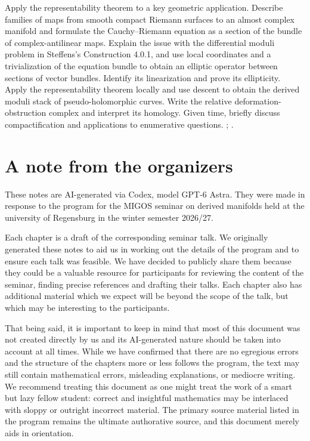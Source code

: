 \documentclass[11pt,a4paper]{book}
\begin{document}
{Apply the representability theorem to a key geometric application.}
{Describe families of maps from smooth compact Riemann surfaces to an almost complex manifold and formulate the Cauchy--Riemann equation as a section of the bundle of complex-antilinear maps. Explain the issue with the differential moduli problem in Steffens's Construction 4.0.1, and use local coordinates and a trivialization of the equation bundle to obtain an elliptic operator between sections of vector bundles. Identify its linearization and prove its ellipticity. Apply the representability theorem locally and use descent to obtain the derived moduli stack of pseudo-holomorphic curves. Write the relative deformation-obstruction complex and interpret its homology. Given time, briefly discuss compactification and applications to enumerative questions.}
{\textcite[Sections~2.1, 2.3--2.4, and
	3.3--3.4]{Wendl_Lectures_Holomorphic_Curves};
	\textcite[Section~4]{Steffens_Representability_Elliptic_Moduli}.}
	
\chapter*{A note from the organizers}

These notes are AI-generated via Codex, model GPT-6 Astra. They were made in response to the program for the MIGOS seminar on derived manifolds held at the university of Regensburg in the winter semester 2026/27. 

Each chapter is a draft of the corresponding seminar talk. We originally generated these notes to aid us in working out the details of the program and to ensure each talk was feasible. We have decided to publicly share them because they could be a valuable resource for participants for reviewing the content of the seminar, finding precise references and drafting their talks. Each chapter also has additional material which we expect will be beyond the scope of the talk, but which may be interesting to the participants.

That being said, it is important to keep in mind that most of this document was not created directly by us and its AI-generated nature should be taken into account at all times. While we have confirmed that there are no egregious errors and the structure of the chapters more or less follows the program, the text may still contain mathematical errors, misleading explanations, or mediocre writing. We recommend treating this document as one might treat the work of a smart but lazy fellow student: correct and insightful mathematics may be interlaced with sloppy or outright incorrect material. The primary source material listed in the program remains the ultimate authorative source, and this document merely aids in orientation.
\end{document}
